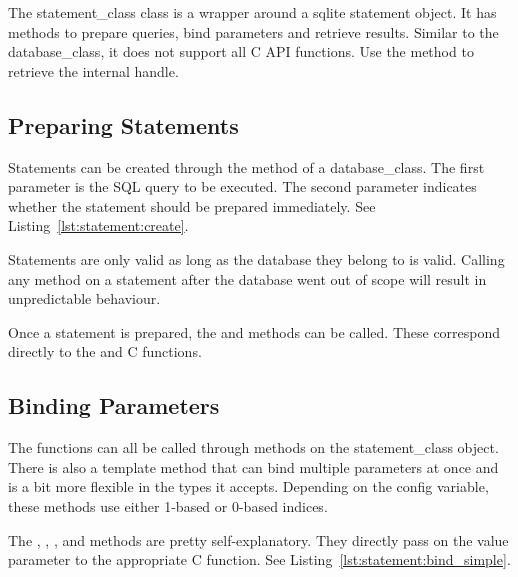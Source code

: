 The \gls{statement_class} class is a wrapper around a \gls{sqlite} statement object. It has methods to prepare queries, bind parameters and retrieve results. Similar to the \gls{database_class}, it does not support all C API functions. Use the  method to retrieve the internal handle.

\subsection{Preparing Statements}
\label{section:statement:create}

Statements can be created through the  method of a \gls{database_class}. The first parameter is the SQL query to be executed. The second parameter indicates whether the statement should be prepared immediately. See Listing~\ref{lst:statement:create}.



Statements are only valid as long as the database they belong to is valid. Calling any method on a statement after the database went out of scope will result in unpredictable behaviour.

Once a statement is prepared, the  and  methods can be called. These correspond directly to the  and  C functions.

\subsection{Binding Parameters}
\label{section:statement:bind}

The  functions can all be called through methods on the \gls{statement_class} object. There is also a template method that can bind multiple parameters at once and is a bit more flexible in the types it accepts. Depending on the  config variable, these methods use either 1-based or 0-based indices.

The , , ,  and  methods are pretty self-explanatory. They directly pass on the value parameter to the appropriate C function. See Listing~\ref{lst:statement:bind_simple}.



